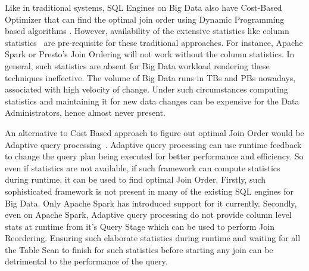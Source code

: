 \documentclass[conference]{IEEEtran}
\begin{document}
Like in traditional systems, SQL Engines on Big Data also have Cost-Based Optimizer that can find the optimal join order using Dynamic Programming based algorithms \cite{b1}. However, availability of the extensive statistics like column statistics~\cite{b11} are pre-requisite for these traditional approaches. For instance, Apache Spark or Presto's Join Ordering will not work without the column statistics. In general, such statistics are absent for Big Data workload rendering these techniques ineffective. The volume of Big Data runs in TBs and PBs nowadays, associated with high velocity of change. Under such circumstances  computing statistics and maintaining it for new data changes can be expensive for the Data Administrators, hence almost never present.

An alternative to Cost Based approach to figure out optimal Join Order would be Adaptive query processing~\cite{b12}. Adaptive query processing can use runtime feedback to change the query plan being executed for better performance and efficiency. So even if statistics are not available, if such framework can compute statistics during runtime, it can be used to find optimal Join Order.
Firstly, such sophisticated framework is not present in many of the existing SQL engines for Big Data. Only Apache Spark has introduced support for it currently.  Secondly, 
even on Apache Spark, Adaptive query processing  do not provide column level stats at runtime from it's Query Stage which can be used to perform Join Reordering. Ensuring such elaborate statistics during runtime and waiting for all the Table Scan to finish for such statistics before starting any join can be detrimental to the performance of the query.
\end{document}
